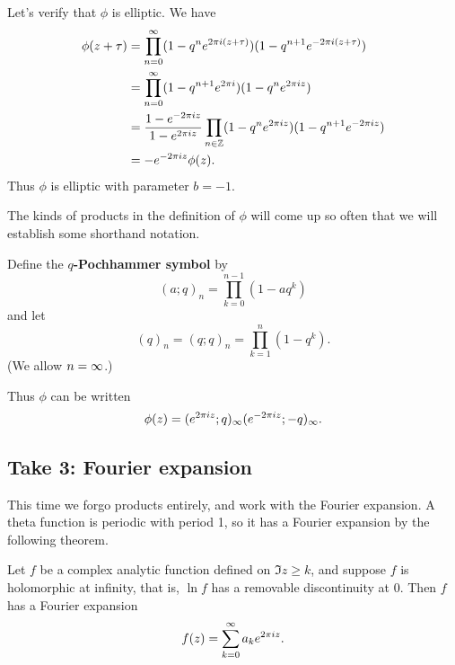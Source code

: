 Let's verify that $\phi$ is elliptic. We have
\begin{align*}
\phi(z+\tau)&=\prod_{n=0}^{\infty} (1-q^ne^{2\pi i(z+\tau)})(1-q^{n+1}e^{-2\pi i (z+\tau)})\\
&=\prod_{n=0}^{\infty} (1-q^{n+1}e^{2\pi i})(1-q^n e^{2\pi iz})\\
&=\frac{1-e^{-2\pi i z}}{1-e^{2\pi i z}}\prod_{n\in \mathbb{Z}}(1-q^n e^{2\pi i z})(1-q^{n+1}e^{-2\pi i z})\\
&=-e^{-2\pi iz}\phi(z).
\end{align*}
Thus $\phi$ is elliptic with parameter $b=-1$.

The kinds of products in the definition of $\phi$ will come up so often that we will establish some shorthand notation.
\begin{df}
Define the \textbf{$q$-Pochhammer symbol} by
\[
(a;q)_n=\prod_{k=0}^{n-1} (1-aq^k)
\]
and let
\[
(q)_n=(q;q)_n=\prod_{k=1}^{n}(1-q^k).
\]
(We allow $n=\infty$.)
\end{df}
Thus $\phi$ can be written
\[
\phi(z)=(e^{2\pi i z};q)_{\infty}(e^{-2\pi i z};-q)_{\infty}.
\]
\subsection{Take 3: Fourier expansion}
This time we forgo products entirely, and work with the Fourier expansion. A theta function is periodic with period 1, so it has a Fourier expansion by the following theorem.
\begin{pr}
Let $f$ be a complex analytic function defined on $\Im z\ge k$, and suppose $f$ is holomorphic at infinity, that is, $\ln f$ has a removable discontinuity at $0$. Then $f$ has a Fourier expansion
\[
f(z)=\sum_{k=0}^{\infty} a_k e^{2\pi i z}.
\]
\end{pr}

